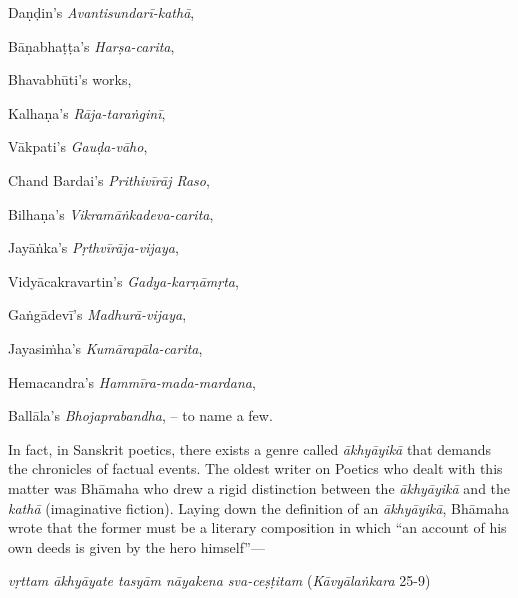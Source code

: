Daṇḍin’s {\sl Avantisundarī-kathā}, 

Bāṇabhaṭṭa’s {\sl Harṣa-carita},

Bhavabhūti's works,

Kalhaṇa’s {\sl Rāja-taraṅginī}, 

Vākpati’s {\sl Gauḍa-vāho}, 

Chand Bardai’s {\sl Prithivīrāj Raso}, 

Bilhaṇa’s {\sl Vikramāṅkadeva-carita}, 

Jayāṅka's {\sl Pṛthvīrāja-vijaya}, 
 
Vidyācakravartin’s {\sl Gadya-karṇāmṛta}, 

Gaṅgā\-devī’s {\sl Madhurā-vijaya}, 

Jayasiṁha’s {\sl Kumārapāla-carita}, 

Hemacandra’s {\sl Hammīra-mada-mardana}, 

Ballāla’s {\sl Bhojaprabandha}, -- to name a few. 

In fact, in Sanskrit poetics, there exists a genre called {\sl ākhyāyikā} that demands the chronicles of factual events. The oldest writer on Poetics who dealt with this matter was Bhāmaha who drew a rigid distinction between the {\sl ākhyāyikā} and the {\sl kathā} (imaginative fiction). Laying down the definition of an {\sl ākhyāyikā}, Bhāmaha wrote that the former must be a literary composition in which “an account of his own deeds is given by the hero himself”— 

{\sl vṛttam ākhyāyate tasyām nāyakena sva-ceṣṭitam} 	          \hfill{({\sl Kāvyālaṅkara} 25-9)}

